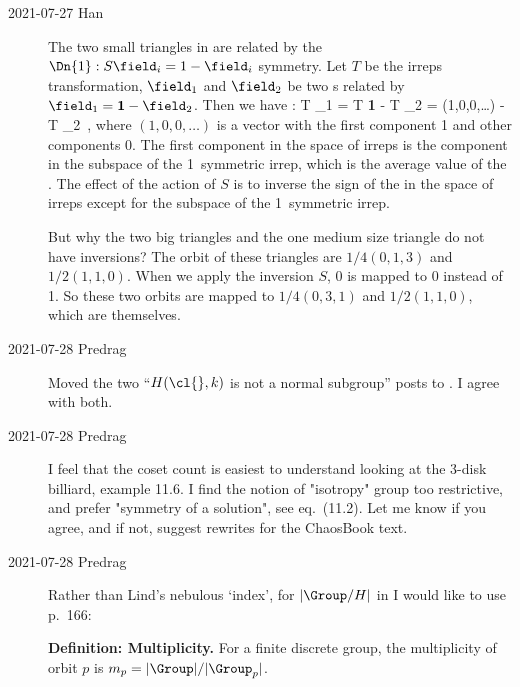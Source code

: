 \begin{description}
\item[2021-07-27 Han]
The two small triangles in  are related by
the $\Dn{1}: S\field_i = 1-\field_i$ symmetry. Let $T$ be the irreps transformation,
$\field_1$ and $\field_2$ be two {\lattstate}s related by $\field_1 = {\bf 1} - \field_2$.
Then we have :
\bea
T \field_1 = T {\bf 1} - T \field_2 = (1,0,0,\dots) - T \field_2 \,,
\eea
where $(1,0,0,\dots)$ is a vector with the first component 1 and other components 0.
The first component in the space of irreps is the component in the subspace of the
1\dmn\ symmetric irrep, which is the average value of the {\lattstate}. The effect of
the action of $S$ is to inverse the sign of the {\lattstate} in the space of irreps except
for the subspace of the 1\dmn\ symmetric irrep.

But why the two big triangles and the one medium size triangle do not have inversions?
The orbit of these triangles are $1/4(0,1,3)$ and $1/2 (1,1,0)$. When we apply the inversion
$S$, 0 is mapped to 0 instead of 1. So these two orbits are mapped to $1/4(0,3,1)$ and
$1/2 (1,1,0)$, which are themselves.

\item[2021-07-28 Predrag]
Moved the two ``$H(\cl{},k)$ is not a normal subgroup'' posts to
. I agree with both.

\item[2021-07-28 Predrag]
I feel  that the coset count is easiest
to understand looking at the 3-disk billiard, 
{example 11.6}. I find the notion of "isotropy" group too
restrictive, and prefer "symmetry of a solution", see
 {eq.~(11.2)}. Let me know if you agree, and
if not, suggest rewrites for the ChaosBook text.

\item[2021-07-28 Predrag]
Rather than Lind's nebulous `index', for $|\Group/{H}|$ in
 I would like to use 
{p.~166}:

{\bf Definition:
            Multiplicity.}
For a finite discrete group, the multiplicity of orbit $p$
is $m_p=|\Group|/|\Group_{p}|$.



\end{description}
